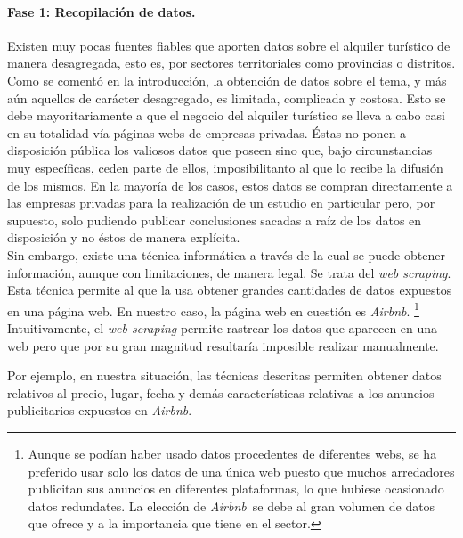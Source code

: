 \documentclass[a4paper,10pt]{article}
\newcommand*{\airbnb}{\textit{Airbnb}}
\begin{document}
\begin{multicols}{2}
            \paragraph*{\textbf{Fase 1: Recopilación de datos.}}
            Existen muy pocas fuentes fiables que aporten datos sobre el alquiler turístico de manera desagregada, esto es, 
            por sectores territoriales como provincias o distritos.
            Como se comentó en la introducción, la obtención de datos sobre el tema, y más aún aquellos de carácter desagregado, es limitada, complicada
            y costosa. Esto se debe mayoritariamente a que el negocio del alquiler turístico se lleva a cabo casi en su totalidad vía páginas webs de empresas
            privadas. Éstas no ponen a disposición pública los valiosos datos que poseen sino que, bajo circunstancias muy específicas, ceden parte de ellos, imposibilitanto al que lo recibe la difusión de los mismos. En la mayoría de los casos, estos datos se compran directamente a las empresas privadas para 
            la realización de un estudio en particular pero, por supuesto, solo pudiendo publicar conclusiones sacadas a raíz de los datos en disposición y no éstos 
            de manera explícita. \\

            \noindent
            Sin embargo, existe una técnica informática a través de la cual se puede obtener información, aunque con limitaciones, de manera legal.
            Se trata del \textit{web scraping}. Esta técnica permite al que la usa obtener grandes cantidades de datos expuestos en una página web.
            En nuestro caso, la página web en cuestión es \textit{Airbnb}. \footnote{Aunque se podían haber usado datos procedentes de diferentes webs, 
            se ha preferido usar solo los datos de una única web puesto que muchos arredadores publicitan sus anuncios en diferentes plataformas, lo que hubiese 
            ocasionado datos redundates. La elección de \airbnb \ se debe al gran volumen de datos que ofrece y a la importancia que tiene en el sector.} \\
           
            \noindent
            Intuitivamente, el \textit{web scraping} permite rastrear los datos que aparecen 
            en una web pero que por su gran magnitud resultaría imposible realizar manualmente. 
            \vfill\null
            
            \columnbreak
            \noindent
            Por ejemplo, en nuestra situación, las técnicas descritas 
            permiten obtener datos relativos al precio, lugar, fecha y demás características relativas a los anuncios publicitarios expuestos en \airbnb. \\
        

\end{multicols}
\end{document}
